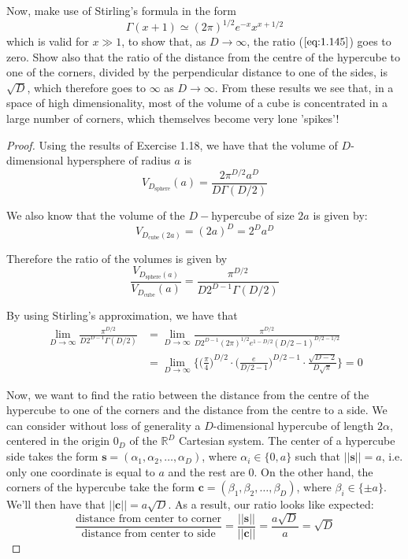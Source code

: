 Now, make use of Stirling's formula in the form
\begin{equation}\label{eq:1.146}\tag{1.146}
    \Gamma(x + 1) \simeq (2\pi)^{1/2} e^{-x} x^{x + 1/2}
\end{equation}
which is valid for $x \gg 1$, to show that, as $D \to \infty$, the
ratio ($\ref{eq:1.145}$) goes to zero. Show also that the ratio
of the distance from the centre of the hypercube to one
of the corners, divided by the perpendicular distance to one of the
sides, is $\sqrt{D}$, which therefore goes to $\infty$ as $D \to \infty$.
From these results we see that, in a space of high dimensionality,
most of the volume of a cube is concentrated in a large number
of corners, which themselves become very lone 'spikes'!

\vspace{1em}

\begin{proof}
    Using the results of Exercise 1.18, we have that the volume of 
    $D$-dimensional hypersphere of radius $a$ is 
    \[
        V_{D_{\text{sphere}}}(a) = \frac{2\pi^{D/2} a^D}{D\Gamma(D/2)}
    \] 

    We also know that the volume of the $D-$hypercube of size $2a$ 
    is given by:
    \[
        V_{D_{\text{cube}}(2a)} = (2a)^D = 2^D a^D
    \] 

    Therefore the ratio of the volumes is given by
    \begin{equation}\tag{1.145}
        \frac{V_{D_{\text{sphere}}(a)}}{V_{D_{\text{cube}}}(a)} = \frac{\pi^{D/2}}{D 2^{D - 1}\Gamma(D/2)}
    \end{equation}

    By using Stirling's approximation, we have that
    \begin{align*}
    \lim_{D \to \infty} \frac{\pi^{D/2}}{D 2^{D - 1}\Gamma(D/2)}
    &= \lim_{D \to \infty} \frac{\pi^{D/2}}{D 2^{D - 1} (2\pi)^{1/2}e^{1 - D/2} (D/2 - 1)^{D/2 - 1/2}} \\
    &= \lim_{D \to \infty} \bigg\{\bigg(\frac{\pi}{4}\bigg)^{D/2} \cdot \bigg(\frac{e}{D/2 - 1}\bigg)^{D/2 - 1} \cdot \frac{\sqrt{D - 2}}{D\sqrt{\pi}}\bigg\} = 0
    \end{align*}

    Now, we want to find the ratio between the distance from the centre of the hypercube to one
    of the corners and the distance from the centre to a side. We can consider without loss of 
    generality a $D$-dimensional hypercube of length $2\alpha$, centered in the origin $0_D$ of the 
    $\mathbb{R}^D$ Cartesian system. The center of a hypercube side takes the form 
    $\mathbf{s} = (\alpha_1, \alpha_2, \ldots, \alpha_D)$, where $\alpha_i \in \{0, a\}$ such 
    that $||\mathbf{s}|| = a$, i.e. only one coordinate is equal to $a$ and the rest are $0$. 
    On the other hand, the corners of the hypercube take the 
    form $\mathbf{c} = (\beta_1, \beta_2, \ldots, \beta_D)$, where $\beta_i \in \{\pm a\}$.
    We'll then have that $||\mathbf{c}|| = a\sqrt{D}$. As a result, our ratio looks like expected:
    \[
        \frac{\text{distance from center to corner}}{\text{distance from center to side}} 
        = \frac{||\mathbf{s}||}{||\mathbf{c}||} = \frac{a\sqrt{D}}{a} = \sqrt{D}
    \] 
\end{proof}

